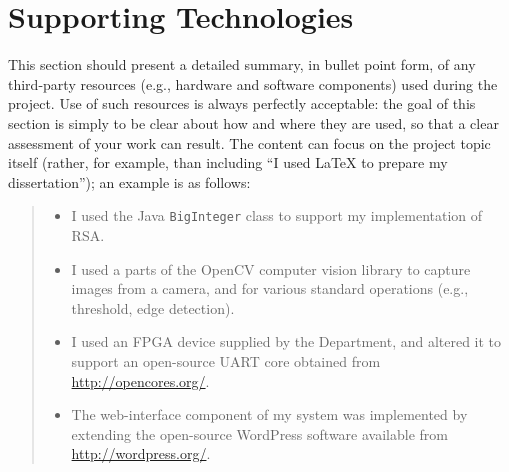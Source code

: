 \documentclass[dissertation.tex]{subfiles}
\begin{document}
\chapter*{Supporting Technologies}\label{chap:technologies}

\noindent
This section should present a detailed summary, in bullet point form,
of any third-party resources (e.g., hardware and software components)
used during the project.  Use of such resources is always perfectly
acceptable: the goal of this section is simply to be clear about how
and where they are used, so that a clear assessment of your work can
result.  The content can focus on the project topic itself (rather,
for example, than including ``I used \mbox{\LaTeX} to prepare my
dissertation''); an example is as follows:

\begin{quote}
\noindent
\begin{itemize}
\item I used the Java {\tt BigInteger} class to support my implementation
      of RSA.
\item I used a parts of the OpenCV computer vision library to capture
      images from a camera, and for various standard operations (e.g.,
      threshold, edge detection).
\item I used an FPGA device supplied by the Department, and altered it
      to support an open-source UART core obtained from
      \url{http://opencores.org/}.
\item The web-interface component of my system was implemented by
      extending the open-source WordPress software available from
      \url{http://wordpress.org/}.
\end{itemize}
\end{quote}
\end{document}

